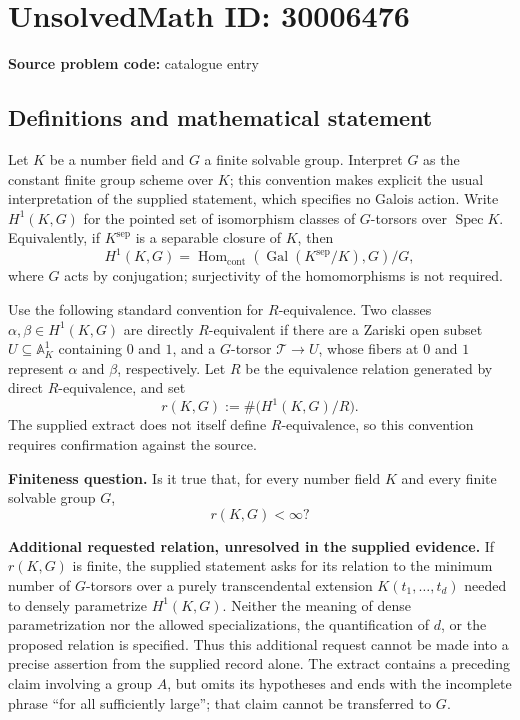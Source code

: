 \documentclass[11pt]{article}
\begin{document}
\section*{UnsolvedMath ID: 30006476}
\textbf{Source problem code:} catalogue entry
\subsection{Definitions and mathematical statement}
Let \(K\) be a number field and \(G\) a finite solvable group. Interpret \(G\) as the constant finite group scheme over \(K\); this convention makes explicit the usual interpretation of the supplied statement, which specifies no Galois action. Write \(H^1(K,G)\) for the pointed set of isomorphism classes of \(G\)-torsors over \(\operatorname{Spec}K\). Equivalently, if \(K^{\mathrm{sep}}\) is a separable closure of \(K\), then
\[
H^1(K,G)=\operatorname{Hom}_{\mathrm{cont}}\!\left(\operatorname{Gal}(K^{\mathrm{sep}}/K),G\right)/G,
\]
where \(G\) acts by conjugation; surjectivity of the homomorphisms is not required.

Use the following standard convention for \(R\)-equivalence. Two classes \(\alpha,\beta\in H^1(K,G)\) are directly \(R\)-equivalent if there are a Zariski open subset \(U\subseteq\mathbb A^1_K\) containing \(0\) and \(1\), and a \(G\)-torsor \(\mathcal T\to U\), whose fibers at \(0\) and \(1\) represent \(\alpha\) and \(\beta\), respectively. Let \(R\) be the equivalence relation generated by direct \(R\)-equivalence, and set
\[
r(K,G):=\#\bigl(H^1(K,G)/R\bigr).
\]
The supplied extract does not itself define \(R\)-equivalence, so this convention requires confirmation against the source.

\textbf{Finiteness question.} Is it true that, for every number field \(K\) and every finite solvable group \(G\),
\[
r(K,G)<\infty?
\]

\textbf{Additional requested relation, unresolved in the supplied evidence.} If \(r(K,G)\) is finite, the supplied statement asks for its relation to the minimum number of \(G\)-torsors over a purely transcendental extension \(K(t_1,\ldots,t_d)\) needed to densely parametrize \(H^1(K,G)\). Neither the meaning of dense parametrization nor the allowed specializations, the quantification of \(d\), or the proposed relation is specified. Thus this additional request cannot be made into a precise assertion from the supplied record alone. The extract contains a preceding claim involving a group \(A\), but omits its hypotheses and ends with the incomplete phrase ``for all sufficiently large''; that claim cannot be transferred to \(G\).
\end{document}
